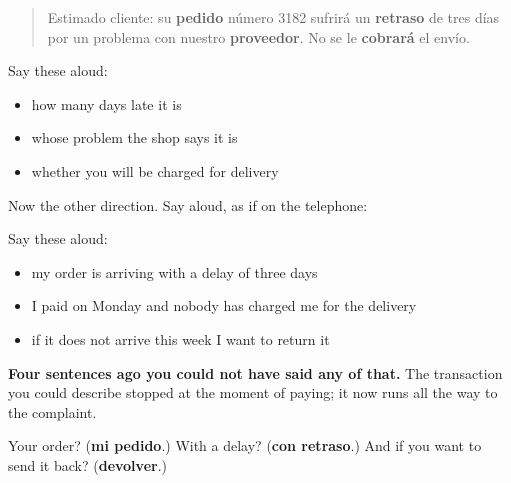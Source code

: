 \begin{quote}
Estimado cliente: su \textbf{pedido} número 3182 sufrirá un \textbf{retraso} de tres días por un problema con nuestro \textbf{proveedor}. No se le \textbf{cobrará} el envío.
\end{quote}

Say these aloud:

\begin{itemize}
\raggedright
  \item how many days late it is
  \item whose problem the shop says it is
  \item whether you will be charged for delivery
\end{itemize}

\begin{grammarlens}[title={What you've built}]
Now the other direction. Say aloud, as if on the telephone:

Say these aloud:

\begin{itemize}
\raggedright
  \item my order is arriving with a delay of three days
  \item I paid on Monday and nobody has charged me for the delivery
  \item if it does not arrive this week I want to return it
\end{itemize}

\textbf{Four sentences ago you could not have said any of that.} The transaction you could describe stopped at the moment of paying; it now runs all the way to the complaint.
\end{grammarlens}

\begin{tcolorbox}[breakable,colback=teal!4,colframe=teal!35!black,title={Before you move on}]
Your order? (\textbf{mi pedido}.) With a delay? (\textbf{con retraso}.) And if you want to send it back? (\textbf{devolver}.)
\end{tcolorbox}
